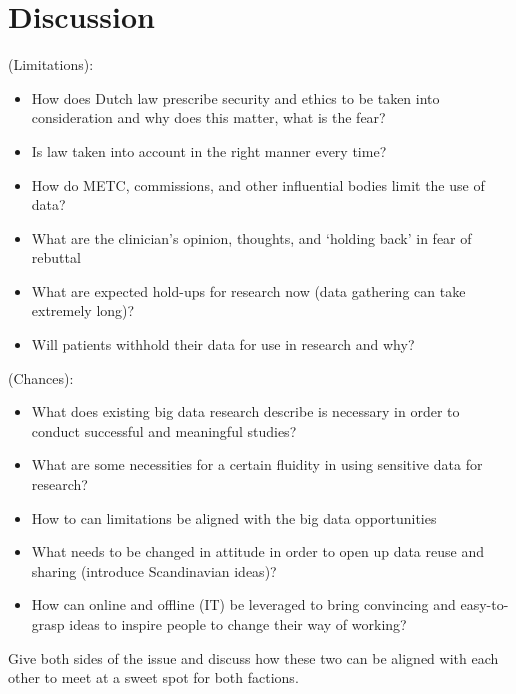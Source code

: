 \section{Discussion}
(Limitations):
\begin{itemize}
	\item How does Dutch law prescribe security and ethics to be taken into consideration and why does this matter, what is the fear?
	\item Is law taken into account in the right manner every time?
	\item How do METC, commissions, and other influential bodies limit the use of data?
	\item What are the clinician's opinion, thoughts, and `holding back' in fear of rebuttal
	\item What are expected hold-ups for research now (data gathering can take extremely long)?
	\item Will patients withhold their data for use in research and why?
\end{itemize}
(Chances):
\begin{itemize}
	\item What does existing big data research describe is necessary in order to conduct successful and meaningful studies?
	\item What are some necessities for a certain fluidity in using sensitive data for research?
	\item How to can limitations be aligned with the big data opportunities
	\item What needs to be changed in attitude in order to open up data reuse and sharing (introduce Scandinavian ideas)?
	\item How can online and offline (IT) be leveraged to bring convincing and easy-to-grasp ideas to inspire people to change their way of working?
\end{itemize}
Give both sides of the issue and discuss how these two can be aligned with each other to meet at a sweet spot for both factions.